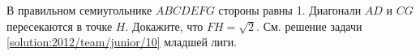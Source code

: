 \problem{}
В правильном семиугольнике $ABCDEFG$ стороны равны 1.
Диагонали $AD$ и $CG$ пересекаются в точке $H$.
Докажите, что $FH = \sqrt{2}$.
\solution
См. решение задачи \ref{solution:2012/team/junior/10} младшей лиги.
\endproblem
